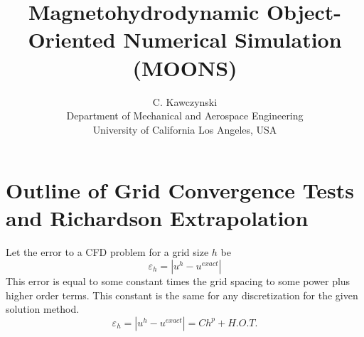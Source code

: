\documentclass[11pt]{article}
\begin{document}
\doublespacing
\title{Magnetohydrodynamic Object-Oriented Numerical Simulation (MOONS)}
\author{C. Kawczynski \\
Department of Mechanical and Aerospace Engineering \\
University of California Los Angeles, USA\\
}
\maketitle

\section{Outline of Grid Convergence Tests and Richardson Extrapolation}
Let the error to a CFD problem for a grid size $h$ be
\begin{equation}
	\varepsilon_{h} = |u^{h} - u^{exact}|
\end{equation}
This error is equal to some constant times the grid spacing to some power plus higher order terms. This constant is the same for any discretization for the given solution method.
\begin{equation}
	\varepsilon_{h} 
	=
	|u^{h} - u^{exact}|
	=
	C h^p + H.O.T.
\end{equation}
\end{document}
